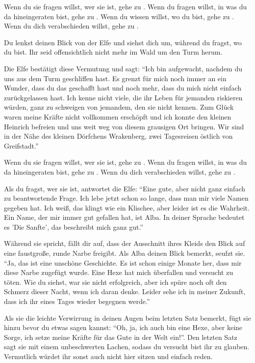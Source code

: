 Wenn du sie fragen willst, wer sie ist, gehe zu . Wenn du fragen willst, in was du da hineingeraten bist, gehe zu . Wenn du wissen willst, wo du bist, gehe zu . Wenn du dich verabschieden willst, gehe zu .


Du lenkst deinen Blick von der Elfe und siehst dich um, während du fragst, wo du bist. Ihr seid offensichtlich nicht mehr im Wald um den Turm herum.

Die Elfe bestätigt diese Vermutung und sagt: ``Ich bin aufgewacht, nachdem du uns aus dem Turm geschliffen hast.
Es grenzt für mich noch immer an ein Wunder, dass du das geschafft hast und noch mehr, dass du mich nicht einfach zurückgelassen hast.
Ich kenne nicht viele, die ihr Leben für jemanden riskieren würden, ganz zu schweigen von jemandem, den sie nicht kennen.
Zum Glück waren meine Kräfte nicht vollkommen erschöpft und ich konnte den kleinen Heinrich befreien und uns weit weg von diesem grausigen Ort bringen.
Wir sind in der Nähe des kleinen Dörfchens Wrakenberg, zwei Tagesreisen östlich von Greifstadt.''

Wenn du sie fragen willst, wer sie ist, gehe zu . Wenn du fragen willst, in was du da hineingeraten bist, gehe zu . Wenn du dich verabschieden willst, gehe zu .


Als du fragst, wer sie ist, antwortet die Elfe: ``Eine gute, aber nicht ganz einfach zu beantwortende Frage. Ich lebe jetzt schon so lange, dass man mir viele Namen gegeben hat.
Ich weiß, das klingt wie ein Klischee, aber leider ist es die Wahrheit.
Ein Name, der mir immer gut gefallen hat, ist Alba.
In deiner Sprache bedeutet es 'Die Sanfte', das beschreibt mich ganz gut.''

Während sie spricht, fällt dir auf, dass der Ausschnitt ihres Kleids den Blick auf eine faustgroße, runde Narbe freigibt. Als Alba deinen Blick bemerkt, seufzt sie. ``Ja, das ist eine unschöne Geschichte. Es ist schon einige Monate her, dass mir diese Narbe zugefügt wurde. Eine Hexe hat mich überfallen und versucht zu töten. Wie du siehst, war sie nicht erfolgreich, aber ich spüre noch oft den Schmerz dieser Nacht, wenn ich daran denke. Leider sehe ich in meiner Zukunft, dass ich ihr eines Tages wieder begegnen werde.''

Als sie die leichte Verwirrung in deinen Augen beim letzten Satz bemerkt, fügt sie hinzu bevor du etwas sagen kannst: ``Oh, ja, ich auch bin eine Hexe, aber keine Sorge, ich setze meine Kräfte für das Gute in der Welt ein!''. Den letzten Satz sagt sie mit einem unbeschwerten Lachen, sodass du versucht bist ihr zu glauben. Vermutlich würdet ihr sonst auch nicht hier sitzen und einfach reden.

